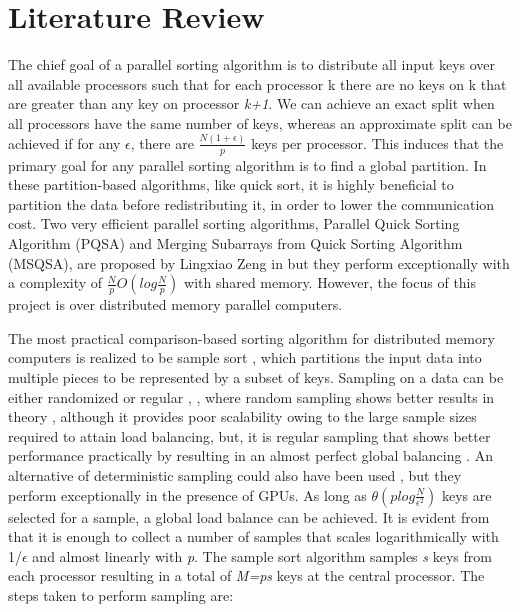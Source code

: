 \documentclass[11pt]{article}       %
\begin{document}
\section{Literature Review} \label{litrev}
\par
The chief goal of a parallel sorting algorithm is to distribute all input keys over all available processors such that for each processor k there are no keys on k that are greater than any key on processor \emph {k+1}. We can achieve an exact split when all processors have the same number of keys, whereas an approximate split can be achieved if for any $\epsilon$, there are $ \frac {N(1+\epsilon)} {p} $  keys per processor\cite{paper1}. This induces that the primary goal for any parallel sorting algorithm is to find a global partition. In these partition-based algorithms, like quick sort, it is highly beneficial to partition the data before redistributing it, in order to lower the communication cost. Two very efficient parallel sorting algorithms, Parallel Quick Sorting Algorithm (PQSA) and Merging Subarrays from Quick Sorting Algorithm (MSQSA), are proposed by Lingxiao Zeng in \cite{two_massive} but they perform exceptionally with a complexity of  $\frac {N}{p}O\left( log \frac{N}{p}\right ) $ with shared memory. However, the focus of this project is over distributed memory parallel computers. \par
The most practical comparison-based sorting algorithm for distributed memory computers is realized to be sample sort \cite{paper1s10}, which partitions the input data into multiple pieces to be represented by a subset of keys. Sampling on a data can be either randomized or regular \cite{random_sampling} , \cite{regular_sampling}, where random sampling shows better results in theory \cite{paper1}, although it provides poor scalability owing to the large sample sizes required to attain load balancing, but, it is regular sampling that shows better performance practically by resulting in an almost perfect global balancing \cite{sampling_result}. An alternative of deterministic sampling could also have been used \cite{dehne}, but they perform exceptionally in the presence of GPUs. As long as $ \theta \left(p  log \frac{N}{\epsilon^2}\right) $  keys are selected for a sample, a global load balance can be achieved. It is evident from \cite{paper1} that it is enough to collect a number of samples that scales logarithmically with 1/$\epsilon$ and almost linearly with \emph p. The sample sort algorithm samples \emph s keys from each processor resulting in a total of \emph{M=ps} keys at the central processor. The steps taken to perform sampling are:
\end{document}
